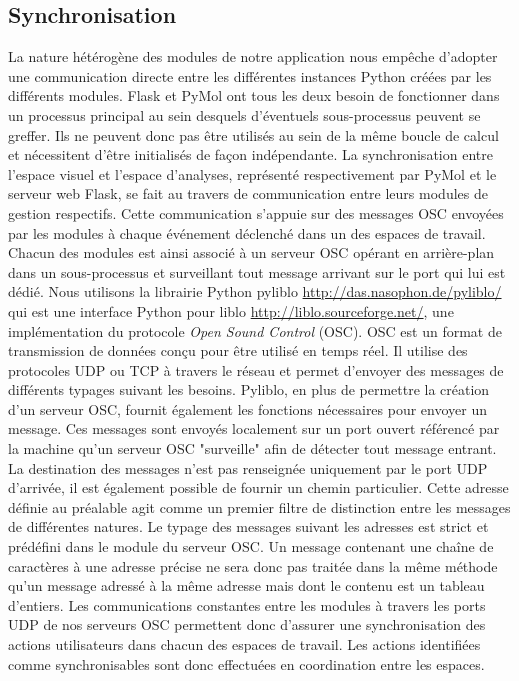 \subsection{Synchronisation}

La nature hétérogène des modules de notre application nous empêche d'adopter une communication directe entre les différentes instances Python créées par les différents modules. Flask et PyMol ont tous les deux besoin de fonctionner dans un processus principal au sein desquels d'éventuels sous-processus peuvent se greffer. Ils ne peuvent donc pas être utilisés au sein de la même boucle de calcul et nécessitent d'être initialisés de façon indépendante. La synchronisation entre l'espace visuel et l'espace d'analyses, représenté respectivement par PyMol et le serveur web Flask, se fait au travers de communication entre leurs modules de gestion respectifs. Cette communication s'appuie sur des messages OSC envoyées par les modules à chaque événement déclenché dans un des espaces de travail. Chacun des modules est ainsi associé à un serveur OSC opérant en arrière-plan dans un sous-processus et surveillant tout message arrivant sur le port qui lui est dédié. Nous utilisons la librairie Python pyliblo \url{http://das.nasophon.de/pyliblo/} qui est une interface Python pour liblo \url{http://liblo.sourceforge.net/}, une implémentation du protocole \textit{Open Sound Control} (OSC). OSC est un format de transmission de données conçu pour être utilisé en temps réel. Il utilise des protocoles UDP ou TCP à travers le réseau et permet d'envoyer des messages de différents typages suivant les besoins. Pyliblo, en plus de permettre la création d'un serveur OSC, fournit également les fonctions nécessaires pour envoyer un message. Ces messages sont envoyés localement sur un port ouvert référencé par la machine qu'un serveur OSC "surveille" afin de détecter tout message entrant. La destination des messages n'est pas renseignée uniquement par le port UDP d'arrivée, il est également possible de fournir un chemin particulier. Cette adresse définie au préalable agit comme un premier filtre de distinction entre les messages de différentes natures. Le typage des messages suivant les adresses est strict et prédéfini dans le module du serveur OSC. Un message contenant une chaîne de caractères à une adresse précise ne sera donc pas traitée dans la même méthode qu'un message adressé à la même adresse mais dont le contenu est un tableau d'entiers.
Les communications constantes entre les modules à travers les ports UDP de nos serveurs OSC permettent donc d'assurer une synchronisation des actions utilisateurs dans chacun des espaces de travail. Les actions identifiées comme synchronisables sont donc effectuées en coordination entre les espaces.
